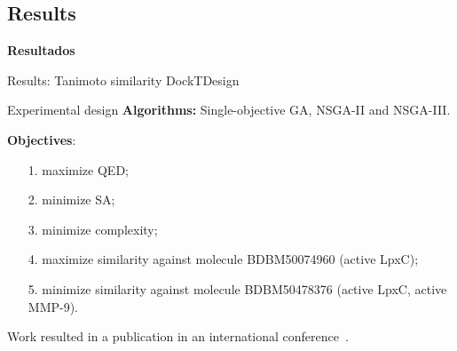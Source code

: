 \documentclass[aspectratio=169,xcolor=dvipsnames]{beamer}
\begin{document}
\subsection{Results}
\begin{frame}  %
    \Large{\centerline{\textbf{Resultados}}}
\end{frame}

\begin{frame}{Results: Tanimoto similarity \hfill {\footnotesize \alert{DockTDesign}}}
    \begin{block}{Experimental design}
        \textbf{Algorithms:} Single-objective GA, NSGA-II and NSGA-III.

        \vspace{0.5em}

        \textbf{Objectives}:
        \begin{itemize}
            \item[1.] maximize QED;
            \item[2.] minimize SA;
            \item[3.] minimize complexity;
            \item[4.] maximize similarity against molecule BDBM50074960 (active LpxC);
            \item[5.] minimize similarity against molecule BDBM50478376 (active LpxC, active MMP-9).
        \end{itemize}
    \end{block}
    \small Work resulted in a publication in an international conference~\cite{da2024generative}.
\end{frame}


\end{document}
